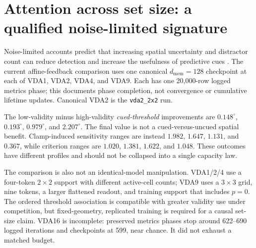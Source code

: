 \section{Attention across set size: a qualified noise-limited signature}
\label{sec:setsize}

Noise-limited accounts predict that increasing spatial uncertainty and distractor
count can reduce detection and increase the usefulness of predictive cues
\cite{carrasco2011_visual_attention_25y}. The current affine-feedback comparison uses
one canonical $d_{\mathrm{mem}}=128$ checkpoint at each of VDA1, VDA2, VDA4, and
VDA9. Each has one 20{,}000-row logged metrics phase; this documents phase completion,
not convergence or cumulative lifetime updates. Canonical VDA2 is the
\texttt{vda2\_2x2} run.

The low-validity minus high-validity \emph{cued-threshold} improvements are
$0.148^\circ$, $0.193^\circ$, $0.979^\circ$, and $2.207^\circ$. The final value is
not a cued-versus-uncued spatial benefit. Clamp-induced sensitivity ranges are instead
$1.982$, $1.647$, $1.131$, and $0.367$, while criterion ranges are $1.020$, $1.381$,
$1.622$, and $1.048$. These outcomes have different profiles and should not be
collapsed into a single capacity law.

The comparison is also not an identical-model manipulation. VDA1/2/4 use a four-token
$2\times2$ support with different active-cell counts; VDA9 uses a $3\times3$ grid,
nine tokens, a larger flattened readout, and training support that includes $p=0$.
The ordered threshold association is compatible with greater validity use under
competition, but fixed-geometry, replicated training is required for a causal set-size
claim. VDA16 is incomplete: preserved metrics phases stop around 622--690 logged
iterations and checkpoints at 599, near chance. It did not exhaust a matched budget.
